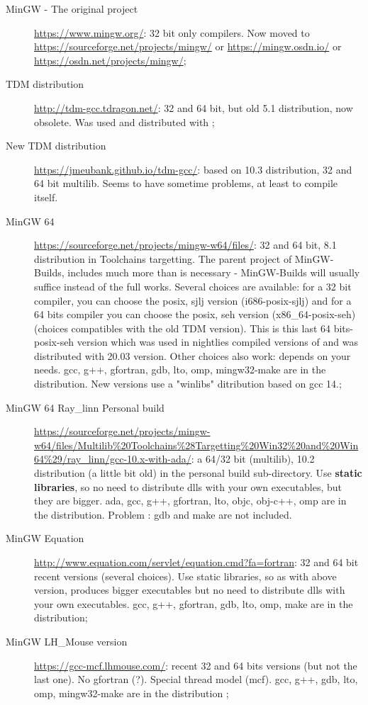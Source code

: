 \begin{description}
\item[MinGW - The original project] \url{https://www.mingw.org/}: 32 bit only compilers. Now moved to \url{https://sourceforge.net/projects/mingw/} or \url{https://mingw.osdn.io/} or \url{https://osdn.net/projects/mingw/};
\item[TDM distribution]\url{http://tdm-gcc.tdragon.net/}: 32 and 64 bit, but old 5.1 distribution, now obsolete. Was used and distributed with ;
\item[New TDM distribution]\url{https://jmeubank.github.io/tdm-gcc/}: based on 10.3 distribution, 32 and 64 bit multilib. Seems to have sometime problems, at least to compile \codeblocks itself.
\item[MinGW 64] \url{https://sourceforge.net/projects/mingw-w64/files/}: 32 and 64 bit, 8.1 distribution in Toolchains targetting. The parent project of MinGW-Builds, includes much more than is necessary - MinGW-Builds will usually suffice instead of the full works. Several choices are available: for a 32 bit compiler, you can choose the posix, sjlj version (i686-posix-sjlj) and for a 64 bits compiler you can choose the posix, seh version (x86\_64-posix-seh) (choices compatibles with the old TDM version). This is this last 64 bits-posix-seh version which was used in nightlies compiled versions of \codeblocks and was distributed with 20.03 version. Other choices also work: depends on your needs. gcc, g++, gfortran, gdb, lto, omp, mingw32-make are in the distribution. New  versions use a "winlibs" ditribution based on gcc 14.;
\item[MinGW 64 Ray\_linn Personal build] \url{https://sourceforge.net/projects/mingw-w64/files/Multilib%20Toolchains%28Targetting%20Win32%20and%20Win64%29/ray_linn/gcc-10.x-with-ada/}: a 64/32 bit (multilib), 10.2 distribution (a little bit old) in the personal build sub-directory. Use \textbf{static libraries}, so no need to distribute dlls with your own executables, but they are bigger. ada, gcc, g++, gfortran, lto, objc, obj-c++, omp are in the distribution. Problem : gdb and make are not included.
\item[MinGW Equation] \url{http://www.equation.com/servlet/equation.cmd?fa=fortran}: 32 and 64 bit recent versions (several choices). Use static libraries, so as with above version, produces bigger executables but no need to distribute dlls with your own executables.  gcc, g++, gfortran, gdb, lto, omp, make are in the distribution;
\item[MinGW LH\_Mouse version] \url{https://gcc-mcf.lhmouse.com/}: recent 32 and 64 bits versions (but not the last one). No gfortran (?). Special thread model (mcf).  gcc, g++, gdb, lto, omp, mingw32-make are in the distribution ;

\end{description}
